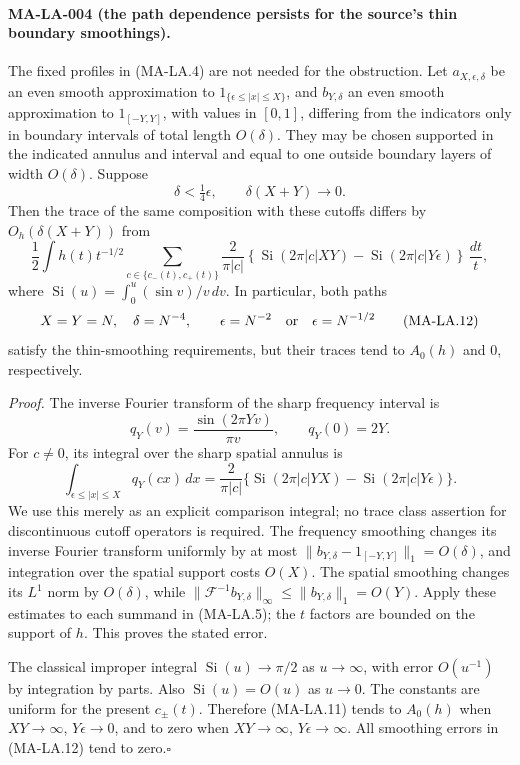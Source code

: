 \paragraph{MA-LA-004 (the path dependence persists for the source's
thin boundary smoothings).}
The fixed profiles in (MA-LA.4) are not needed for the obstruction.
Let $a_{X,\epsilon,\delta}$ be an even smooth approximation to
$1_{\{\epsilon\le|x|\le X\}}$, and $b_{Y,\delta}$ an even smooth
approximation to $1_{[-Y,Y]}$, with values in $[0,1]$, differing
from the indicators only in boundary intervals of total length
$O(\delta)$.  They may be chosen supported in the indicated
annulus and interval and equal to one outside boundary layers of
width $O(\delta)$.  Suppose
\[
 \delta<\tfrac14\epsilon,\qquad
 \delta(X+Y)\longrightarrow0.
 \tag{MA-LA.10}
\]
Then the trace of the same composition with these cutoffs differs
by $O_h(\delta(X+Y))$ from
\[
 \frac12\int h(t)t^{-1/2}
 \sum_{c\in\{c_-(t),c_+(t)\}}
 \frac{2}{\pi|c|}
 \left\{\operatorname{Si}(2\pi|c|XY)
       -\operatorname{Si}(2\pi|c|Y\epsilon)\right\}\,\frac{dt}{t},
 \tag{MA-LA.11}
\]
where $\operatorname{Si}(u)=\int_0^u(\sin v)/v\,dv$.
In particular, both paths
\[
 X=Y=N,\quad\delta=N^{-4},\qquad
 \epsilon=N^{-2}\quad\hbox{or}\quad\epsilon=N^{-1/2}
 \tag{MA-LA.12}
\]
satisfy the thin-smoothing requirements, but their traces tend to
$A_0(h)$ and $0$, respectively.

\emph{Proof.}
The inverse Fourier transform of the sharp frequency interval is
\[
 q_Y(v)=\frac{\sin(2\pi Yv)}{\pi v},\qquad q_Y(0)=2Y.
\]
For $c\ne0$, its integral over the sharp spatial annulus is
\[
 \int_{\epsilon\le|x|\le X}q_Y(cx)\,dx
 =\frac{2}{\pi|c|}
  \{\operatorname{Si}(2\pi|c|YX)
        -\operatorname{Si}(2\pi|c|Y\epsilon)\}.
\]
We use this merely as an explicit comparison integral; no trace
class assertion for discontinuous cutoff operators is required.
The frequency smoothing changes its inverse Fourier transform
uniformly by at most
$\|b_{Y,\delta}-1_{[-Y,Y]}\|_1=O(\delta)$, and integration over
the spatial support costs $O(X)$.
The spatial smoothing changes its $L^1$ norm by $O(\delta)$,
while $\|\mathcal F^{-1}b_{Y,\delta}\|_\infty\le
\|b_{Y,\delta}\|_1=O(Y)$.  Apply these estimates to each summand
in (MA-LA.5); the $t$ factors are bounded on the support of $h$.
This proves the stated error.

The classical improper integral
$\operatorname{Si}(u)\to\pi/2$ as $u\to\infty$, with error
$O(u^{-1})$ by integration by parts.  Also
$\operatorname{Si}(u)=O(u)$ as $u\to0$.  The constants are uniform
for the present $c_\pm(t)$.  Therefore (MA-LA.11) tends to
$A_0(h)$ when $XY\to\infty$, $Y\epsilon\to0$, and to zero
when $XY\to\infty$, $Y\epsilon\to\infty$.
All smoothing errors in (MA-LA.12) tend to zero.\hfill$\square$

